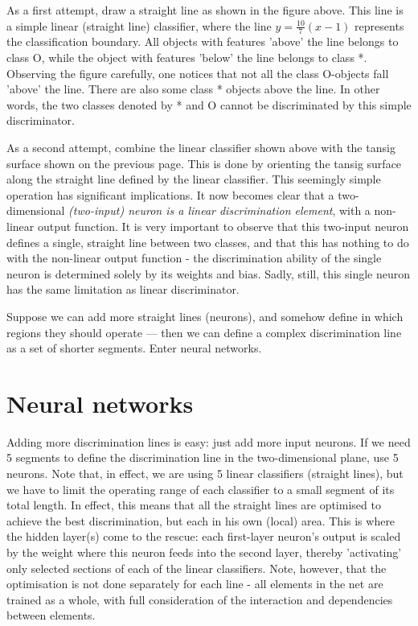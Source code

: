 As a first attempt, draw a straight line as shown in the figure above.  This line is a simple linear (straight line) classifier, where the line $y=\frac{10}{7}(x-1)$  represents the classification boundary.  All objects with features 'above' the line belongs to class O, while the object with features 'below' the line belongs to class *.  Observing the figure carefully, one notices that not all the class O-objects fall 'above' the line.  There are also some class * objects above the line.   In other words, the two classes denoted by * and O cannot be discriminated by this simple discriminator.  

As a second attempt, combine the linear classifier shown above with the tansig surface shown on the previous page.  This is done by orienting the tansig surface along the straight line defined by the linear classifier.  This seemingly simple operation has significant implications.  It now becomes clear that a two-dimensional \textit{(two-input) neuron is a linear discrimination element}, with a non-linear output function.    It is very important to observe that this two-input neuron defines a single, straight line between two classes, and that this has nothing to do with the non-linear output function - the discrimination ability of the single neuron is determined solely by its weights and bias.  Sadly, still, this single neuron has the same limitation as linear discriminator. 

Suppose we can add more straight lines (neurons), and somehow define in which regions they should operate --- then we can define a complex discrimination line as a set of shorter segments.  Enter neural networks.

\section{Neural networks}

Adding more discrimination lines is easy: just add more input neurons.  If we need 5 segments to define the discrimination line in the two-dimensional plane, use 5 neurons.   Note that, in effect, we are using 5 linear classifiers (straight lines), but we have to limit the operating range of each classifier to a small segment of its total length.    In effect, this means that all the straight lines are optimised to achieve the best discrimination, but each in his own (local) area.  This is where the hidden layer(s) come to the rescue:  each first-layer neuron's output is scaled by the weight where this neuron feeds into the second layer, thereby 'activating' only selected sections of each of the linear classifiers.  Note, however, that the optimisation is not done separately for each line - all elements in the net are trained as a whole, with full consideration of the interaction and dependencies between elements.  

